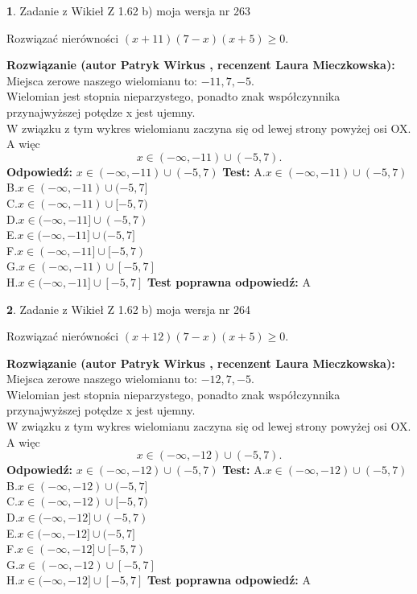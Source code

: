 \documentclass[12pt, a4paper]{article}
\theoremstyle{definition} %
\newtheorem{zad}{}
\newcommand{\zadStart}[1]{\begin{zad}#1\newline}
\newcommand{\zadStop}{\end{zad}}
\newcommand{\rozwStart}[2]{\noindent \textbf{Rozwiązanie (autor #1 , recenzent #2): }\newline}
\newcommand{\rozwStop}{\newline}
\newcommand{\odpStart}{\noindent \textbf{Odpowiedź:}\newline}
\newcommand{\odpStop}{\newline}
\newcommand{\testStart}{\noindent \textbf{Test:}\newline}
\newcommand{\testStop}{\newline}
\newcommand{\kluczStart}{\noindent \textbf{Test poprawna odpowiedź:}\newline}
\newcommand{\kluczStop}{\newline}
\begin{document}
\zadStart{Zadanie z Wikieł Z 1.62 b) moja wersja nr 263}

Rozwiązać nierówności $(x+11)(7-x)(x+5)\ge0$.
\zadStop
\rozwStart{Patryk Wirkus}{Laura Mieczkowska}
Miejsca zerowe naszego wielomianu to: $-11, 7, -5$.\\
Wielomian jest stopnia nieparzystego, ponadto znak współczynnika przy\linebreak najwyższej potędze x jest ujemny.\\ W związku z tym wykres wielomianu zaczyna się od lewej strony powyżej osi OX. A więc $$x \in (-\infty,-11) \cup (-5,7).$$
\rozwStop
\odpStart
$x \in (-\infty,-11) \cup (-5,7)$
\odpStop
\testStart
A.$x \in (-\infty,-11) \cup (-5,7)$\\
B.$x \in (-\infty,-11) \cup (-5,7]$\\
C.$x \in (-\infty,-11) \cup [-5,7)$\\
D.$x \in (-\infty,-11] \cup (-5,7)$\\
E.$x \in (-\infty,-11] \cup (-5,7]$\\
F.$x \in (-\infty,-11] \cup [-5,7)$\\
G.$x \in (-\infty,-11) \cup [-5,7]$\\
H.$x \in (-\infty,-11] \cup [-5,7]$
\testStop
\kluczStart
A
\kluczStop



\zadStart{Zadanie z Wikieł Z 1.62 b) moja wersja nr 264}

Rozwiązać nierówności $(x+12)(7-x)(x+5)\ge0$.
\zadStop
\rozwStart{Patryk Wirkus}{Laura Mieczkowska}
Miejsca zerowe naszego wielomianu to: $-12, 7, -5$.\\
Wielomian jest stopnia nieparzystego, ponadto znak współczynnika przy\linebreak najwyższej potędze x jest ujemny.\\ W związku z tym wykres wielomianu zaczyna się od lewej strony powyżej osi OX. A więc $$x \in (-\infty,-12) \cup (-5,7).$$
\rozwStop
\odpStart
$x \in (-\infty,-12) \cup (-5,7)$
\odpStop
\testStart
A.$x \in (-\infty,-12) \cup (-5,7)$\\
B.$x \in (-\infty,-12) \cup (-5,7]$\\
C.$x \in (-\infty,-12) \cup [-5,7)$\\
D.$x \in (-\infty,-12] \cup (-5,7)$\\
E.$x \in (-\infty,-12] \cup (-5,7]$\\
F.$x \in (-\infty,-12] \cup [-5,7)$\\
G.$x \in (-\infty,-12) \cup [-5,7]$\\
H.$x \in (-\infty,-12] \cup [-5,7]$
\testStop
\kluczStart
A
\kluczStop
\end{document}
